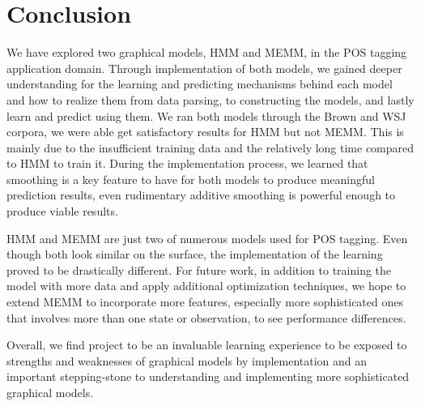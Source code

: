 \section{Conclusion}
We have explored two graphical models, HMM and MEMM, in the POS tagging application domain. Through implementation of both models, we gained deeper understanding for the learning and predicting mechanisms behind each model and how to realize them from data parsing, to constructing the models, and lastly learn and predict using them. We ran both models through the Brown and WSJ corpora, we were able get satisfactory results for HMM but not MEMM. This is mainly due to the insufficient training data and the relatively long time compared to HMM to train it. During the implementation process, we learned that smoothing is a key feature to have for both models to produce meaningful prediction results, even rudimentary additive smoothing is powerful enough to produce viable results.

HMM and MEMM are just two of numerous models used for POS tagging. Even though both look similar on the surface, the implementation of the learning proved to be drastically different. For future work, in addition to training the model with more data and apply additional optimization techniques, we hope to extend MEMM to incorporate more features, especially more sophisticated ones that involves more than one state or observation, to see performance differences.

Overall, we find project to be an invaluable learning experience to be
exposed to strengths and weaknesses of graphical models by implementation and an important stepping-stone to understanding and implementing more sophisticated graphical models.
